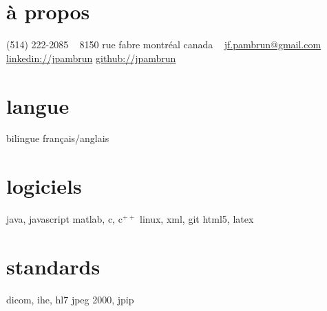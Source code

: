 \documentclass[]{friggeri-cv}
\newif\ifenglish
\begin{document}
\ifenglish
\header{jean-françois}{pambrun}{researcher | engineer | software developer}
\else
{}
\fi


\begin{aside}
    \ifenglish\section{about}\else\section{à propos}\fi
    {\small(514) 222-2085}
    ~
    {\small8150} rue fabre
    montréal
    canada
    ~
    \href{mailto:jf.pambrun@gmail.com}{jf.pambrun@gmail.com}
    \href{https://ca.linkedin.com/in/jpambrun}{linkedin://jpambrun}
    \href{http://github.com/jpambrun}{github://jpambrun}
    \ifenglish\section{languages}\else\section{langue}\fi
    \ifenglish bilingual french/english \else bilingue français/anglais \fi
    \ifenglish\section{programming}\else\section{logiciels}\fi
    java, javascript
    matlab, c, c{\tiny$^{++}$}
    linux, xml, git
    html{\small5}, latex
    \ifenglish\section{standards}\else\section{standards}\fi
    dicom, ihe, hl{\small7}
    jpeg {\small2000}, jpip
\end{aside}

\end{document}
